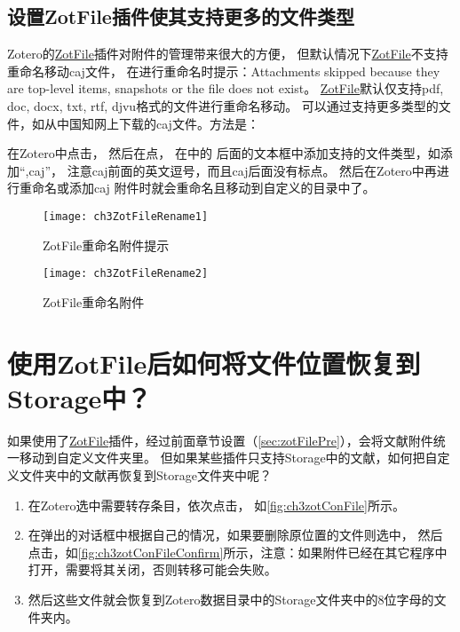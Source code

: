 \documentclass[cn,11pt,chinese]{elegantbook}
\begin{document}
\begin{enumerate}
	\section{设置ZotFile插件使其支持更多的文件类型}\label{sec:zotFile_more_filetype}
	    \quad \quad Zotero的\href{http://zotfile.com/}{ZotFile}插件对附件的管理带来很大的方便，
		但默认情况下\href{http://zotfile.com/}{ZotFile}不支持重命名移动caj文件，
		在进行重命名时提示：Attachments skipped because they are top-level items, 
		snapshots or the file does not exist。
		\href{http://zotfile.com/}{ZotFile}默认仅支持pdf, doc, docx, txt, rtf, djvu格式的文件进行重命名移动。
		可以通过支持更多类型的文件，如从中国知网上下载的caj文件。方法是：

		\quad \quad 在Zotero中点击，
		然后在点，
		在中的
		后面的文本框中添加支持的文件类型，如添加“,caj”，
		注意caj前面的英文逗号，而且caj后面没有标点。
		然后在Zotero中再进行重命名或添加caj
		附件时就会重命名且移动到自定义的目录中了。

	
			\begin{figure}[htbp]
				\centering
				\texttt{[image: ch3ZotFileRename1]}
				\caption{ZotFile重命名附件提示}
				\label{fig:ch3ZotFileRename1}
			\end{figure}
			\begin{figure}[htbp]
				\centering
				\texttt{[image: ch3ZotFileRename2]}
				\caption{ZotFile重命名附件}
				\label{fig:ch3ZotFileRename2}
			\end{figure}
		\end{enumerate}

	\section{使用ZotFile后如何将文件位置恢复到Storage中？}\label{sec:zotFile_restore_storage}

	如果使用了\href{http://zotfile.com/}{ZotFile}插件，经过前面章节设置（\cref{sec:zotFilePre}），会将文献附件统一移动到自定义文件夹里。
	但如果某些插件只支持Storage中的文献，如何把自定义文件夹中的文献再恢复到Storage文件夹中呢？

	\begin{enumerate}
		\item 在Zotero选中需要转存条目，依次点击，
		如\autoref{fig:ch3zotConFile}所示。
		\item 在弹出的对话框中根据自己的情况，如果要删除原位置的文件则选中，
		然后点击，如\autoref{fig:ch3zotConFileConfirm}所示，注意：如果附件已经在其它程序中打开，需要将其关闭，否则转移可能会失败。
		\item 然后这些文件就会恢复到Zotero数据目录中的Storage文件夹中的8位字母的文件夹内。
	\end{enumerate}
	
\end{document}
